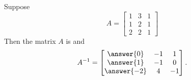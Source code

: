 \documentclass{ximera}
\begin{document}
\begin{exercise}
  Suppose
  \[
    A = \begin{bmatrix} 1 & 3 & 1 \\ 1 & 2 & 1 \\ 2 & 2 & 1\end{bmatrix}
  \]
  Then the matrix $A$ is  and
  \[
    A^{-1} =  \begin{bmatrix} \answer{0} & -1 & 1\\ \answer{1} & -1 & 0\\\answer{-2} & 4 & -1 \end{bmatrix}.
  \]
\end{exercise}
\end{document}
